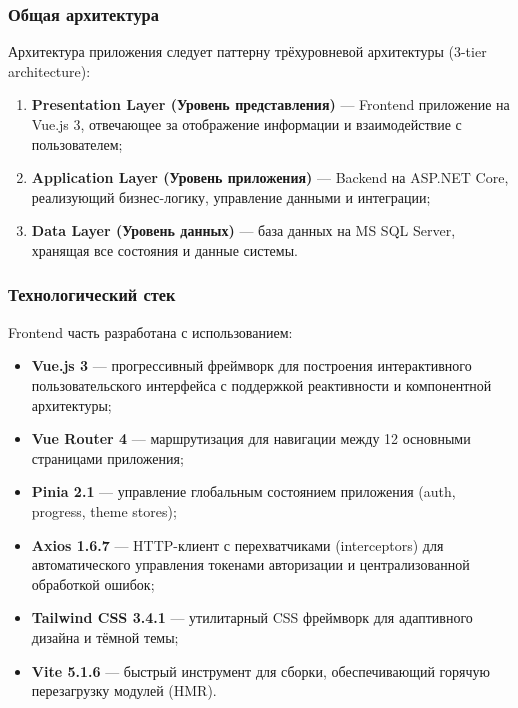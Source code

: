 \subsubsection{Общая архитектура}

Архитектура приложения следует паттерну трёхуровневой архитектуры (3-tier architecture):

\begin{enumerate}
    \item \textbf{Presentation Layer (Уровень представления)} --- Frontend приложение на Vue.js 3, отвечающее за отображение информации и взаимодействие с пользователем;
    \item \textbf{Application Layer (Уровень приложения)} --- Backend на ASP.NET Core, реализующий бизнес-логику, управление данными и интеграции;
    \item \textbf{Data Layer (Уровень данных)} --- база данных на MS SQL Server, хранящая все состояния и данные системы.
\end{enumerate}

\subsubsection{Технологический стек}

Frontend часть разработана с использованием:
\begin{itemize}
    \item \textbf{Vue.js 3} --- прогрессивный фреймворк для построения интерактивного пользовательского интерфейса с поддержкой реактивности и компонентной архитектуры;
    \item \textbf{Vue Router 4} --- маршрутизация для навигации между 12 основными страницами приложения;
    \item \textbf{Pinia 2.1} --- управление глобальным состоянием приложения (auth, progress, theme stores);
    \item \textbf{Axios 1.6.7} --- HTTP-клиент с перехватчиками (interceptors) для автоматического управления токенами авторизации и централизованной обработкой ошибок;
    \item \textbf{Tailwind CSS 3.4.1} --- утилитарный CSS фреймворк для адаптивного дизайна и тёмной темы;
    \item \textbf{Vite 5.1.6} --- быстрый инструмент для сборки, обеспечивающий горячую перезагрузку модулей (HMR).
\end{itemize}

